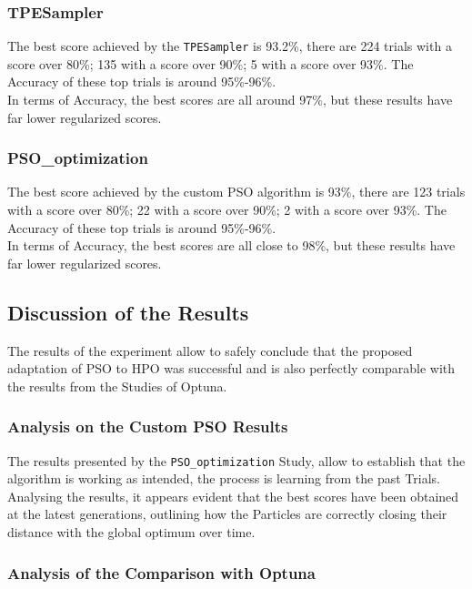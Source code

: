 \subsubsection{TPESampler}

The best score achieved by the \texttt{TPESampler} is 93.2\%, there are 224 trials with a score over 80\%; 135 with a score over 90\%; 5 with a score over 93\%. The Accuracy of these top trials is around 95\%-96\%.
\\[0.3cm]In terms of Accuracy, the best scores are all around 97\%, but these results have far lower regularized scores.

\subsubsection{PSO\_optimization}

The best score achieved by the custom PSO algorithm is 93\%, there are 123 trials with a score over 80\%; 22 with a score over 90\%; 2 with a score over 93\%. The Accuracy of these top trials is around 95\%-96\%.
\\[0.3cm]In terms of Accuracy, the best scores are all close to 98\%, but these results have far lower regularized scores.

\subsection{Discussion of the Results}

The results of the experiment allow to safely conclude that the proposed adaptation of PSO to HPO was successful and is also perfectly comparable with the results from the Studies of Optuna.

\subsubsection{Analysis on the Custom PSO Results}

The results presented by the \texttt{PSO\_optimization} Study, allow to establish that the algorithm is working as intended, the process is learning from the past Trials.
Analysing the results, it appears evident that the best scores have been obtained at the latest generations, outlining how the Particles are correctly closing their distance with the global optimum over time.

\subsubsection{Analysis of the Comparison with Optuna}

